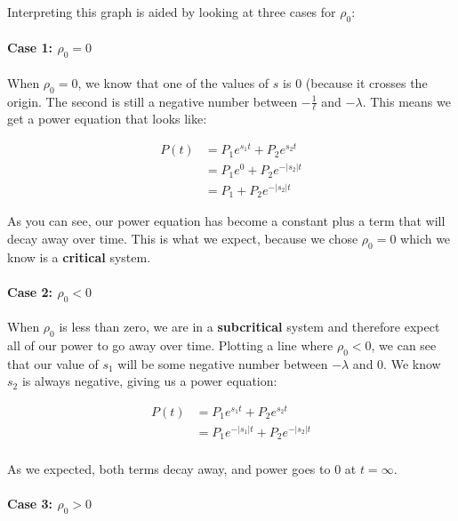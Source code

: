\documentclass[letter]{article}
\begin{document}
Interpreting this graph is aided by looking at three cases
for $\rho_0$:

\paragraph{Case 1: $\rho_0=0$} When $\rho_0 = 0$, we know that one of the
values of $s$ is 0 (because it crosses the origin. The second is still
a negative number between $-\frac{1}{\ell}$ and $-\lambda$. This means
we get a power equation that looks like:

\begin{equation*}
  \begin{split}
    P(t)&=P_1e^{s_1t}+P_2e^{s_2t} \\
    &=P_1e^0+P_2e^{-|s_2|t} \\
    &= P_1 + P_2e^{-|s_2|t}
  \end{split}
\end{equation*}

As you can see, our power equation has become a constant plus a term
that will decay away over time. This is what we expect, because we
chose $\rho_0=0$ which we know is a \textbf{critical} system.

\paragraph{Case 2: $\rho_0<0$}

When $\rho_0$ is less than zero, we are in a \textbf{subcritical}
system and therefore expect all of our power to go away over
time. Plotting a line where $\rho_0 < 0$, we can see that our value of
$s_1$ will be some negative number between $-\lambda$ and 0. We know
$s_2$ is always negative, giving us a power equation:

\begin{equation*}
  \begin{split}
    P(t)&=P_1e^{s_1t}+P_2e^{s_2t} \\
    &=P_1e^{-|s_1|t}+P_2e^{-|s_2|t} \\
  \end{split}
\end{equation*}

As we expected, both terms decay away, and power goes to 0 at
$t=\infty$.

\paragraph{Case 3: $\rho_0>0$}
\end{document}
